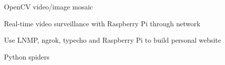 
\begin{cventries}

  \cventry
    {
      \begin{cvitems} %
        \item {OpenCV video/image mosaic}
        \item {Real-time video surveillance with Raspberry Pi through network}
        \item {Use LNMP, ngrok, typecho and Raspberry Pi to build personal website}
        \item {Python spiders}
      \end{cvitems}
    }
    {}
    {}
    {}
    {}

\end{cventries}
